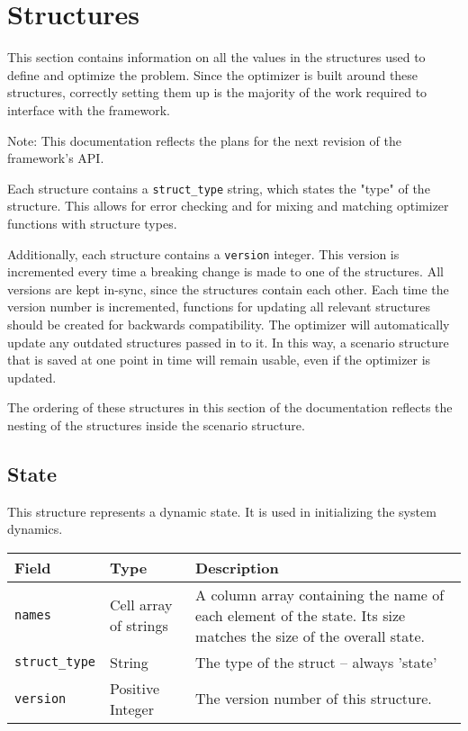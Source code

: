 \documentclass{article}
\begin{document}
	\section{Structures}
		This section contains information on all the values in the structures used to define and optimize the problem.
		Since the optimizer is built around these structures, correctly setting them up is the majority of the work required to
		interface with the framework.

		Note: This documentation reflects the plans for the next revision of the framework's API.

		Each structure contains a \lstinline|struct_type| string, which states the "type" of the structure.
		This allows for error checking and for mixing and matching optimizer functions with structure types.

		Additionally, each structure contains a \lstinline|version| integer. This version is incremented every time a breaking
		change is made to one of the structures. All versions are kept in-sync, since the structures contain each other.
		Each time the version number is incremented, functions for updating all relevant structures should be created for backwards
		compatibility. The optimizer will automatically update any outdated structures passed in to it. In this way, a scenario structure
		that is saved at one point in time will remain usable, even if the optimizer is updated.

		The ordering of these structures in this section of the documentation reflects
		the nesting of the structures inside the scenario structure.

		\subsection{State}
			\label{sec:state} %

			This structure represents a dynamic state. It is used in initializing the system dynamics.

			\vspace{\baselineskip}

			\begin{tabular}{ p{} | p{} | p{}}
				Field                    & Type    & Description                                                                 \\ \hline
				\lstinline|names|        & \raggedright Cell array of strings & A column array containing the name of each element of
				                                                   the state. Its size matches the size of the overall state.    \\[1ex]
				\lstinline|struct_type|  & String  & The type of the struct -- always 'state'                                    \\[1ex]
				\lstinline|version|      & \raggedright Positive Integer & The version number of this structure.
			\end{tabular}
\end{document}
